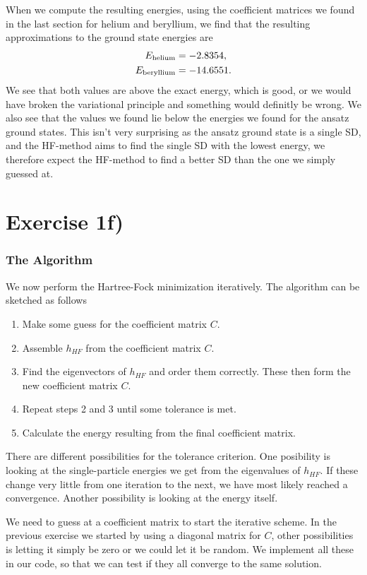 \documentclass[a4paper, 11pt, notitlepage, english]{article}
\begin{document}
When we compute the resulting energies, using the coefficient matrices we found in the last section for helium and beryllium, we find that the resulting approximations to the ground state energies are
\begin{align*}
E_{\rm helium} &= -2.8354, \\
E_{\rm beryllium} &= -14.6551.
\end{align*}
We see that both values are above the exact energy, which is good, or we would have broken the variational principle and something would definitly be wrong. We also see that the values we found lie below the energies we found for the ansatz ground states. This isn't very surprising as the ansatz ground state is a single SD, and the HF-method aims to find the single SD with the lowest energy, we therefore expect the HF-method to find a better SD than the one we simply guessed at.


\clearpage

\section*{Exercise 1f)}
\subsubsection*{The Algorithm}
We now perform the Hartree-Fock minimization iteratively. The algorithm can be sketched as follows
\begin{enumerate}
	\item Make some guess for the coefficient matrix $C$.
	\item Assemble $h_{HF}$ from the coefficient matrix $C$.
	\item Find the eigenvectors of $h_{HF}$ and order them correctly. These then form the new coefficient matrix $C$.
	\item Repeat steps 2 and 3 until some tolerance is met.
	\item Calculate the energy resulting from the final coefficient matrix.
\end{enumerate}
There are different possibilities for the tolerance criterion. One posibility is looking at the single-particle energies we get from the eigenvalues of $h_{HF}$. If these change very little from one iteration to the next, we have most likely reached a convergence. Another possibility is looking at the energy itself.

We need to guess at a coefficient matrix to start the iterative scheme. In the previous exercise we started by using a diagonal matrix for $C$, other possibilities is letting it simply be zero or we could let it be random. We implement all these in our code, so that we can test if they all converge to the same solution.
\end{document}
